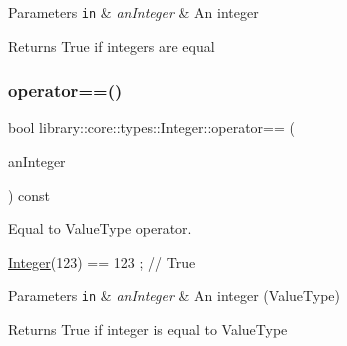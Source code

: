 \begin{DoxyParams}[1]{Parameters}
\mbox{\tt in}  & {\em an\+Integer} & An integer \\
\hline
\end{DoxyParams}
\begin{DoxyReturn}{Returns}
True if integers are equal 
\end{DoxyReturn}
\mbox{\label{classlibrary_1_1core_1_1types_1_1_integer_a02858e726140a9e84281699a41675081}} 
\subsubsection{\texorpdfstring{operator==()}{operator==()}\hspace{0.1cm}{\footnotesize\ttfamily [2/2]}}
{\footnotesize\ttfamily bool library\+::core\+::types\+::\+Integer\+::operator== (\begin{DoxyParamCaption}\item[{const Integer\+::\+Value\+Type \&}]{an\+Integer }\end{DoxyParamCaption}) const}



Equal to Value\+Type operator. 


\begin{DoxyCode}
\hyperlink{classlibrary_1_1core_1_1types_1_1_integer_a6483b1c4e13e5ed6af5e7a58347efead}{Integer}(123) == 123 ; \textcolor{comment}{// True}
\end{DoxyCode}



\begin{DoxyParams}[1]{Parameters}
\mbox{\tt in}  & {\em an\+Integer} & An integer (Value\+Type) \\
\hline
\end{DoxyParams}
\begin{DoxyReturn}{Returns}
True if integer is equal to Value\+Type 
\end{DoxyReturn}
\mbox{\label{classlibrary_1_1core_1_1types_1_1_integer_aa5e59aba88550137a1b120e90ab155fa}} 
